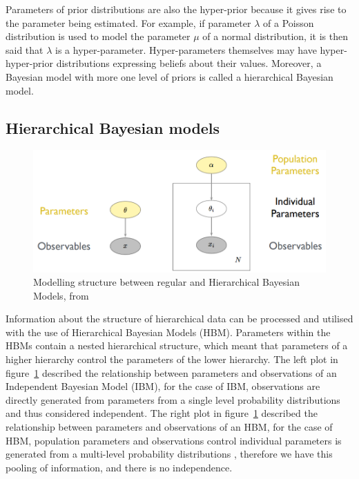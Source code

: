 \newpara

Parameters of prior distributions are also the hyper-prior because it gives rise to the parameter being estimated. For example, if parameter $\lambda$ of a Poisson distribution is used to model the parameter $\mu$ of a normal distribution, it is then said that $\lambda$ is a hyper-parameter. Hyper-parameters themselves may have hyper-hyper-prior distributions expressing beliefs about their values. Moreover, a Bayesian model with more one level of priors is called a hierarchical Bayesian model.

\subsection{Hierarchical Bayesian models}

\begin{figure}[hb]
	\centering
	\includegraphics[width=0.7\linewidth]{Figures/hbm}
	\caption{Modelling structure between regular and Hierarchical Bayesian Models, from \citet{Wolfgang2016}}
	\label{fig:hbm}
\end{figure}

Information about the structure of hierarchical data can be processed and utilised with the use of Hierarchical Bayesian Models (HBM). Parameters within the HBMs contain a nested hierarchical structure, which meant that parameters of a higher hierarchy control the parameters of the lower hierarchy. The left plot in figure~\ref{fig:hbm} described the relationship between parameters and observations of an Independent Bayesian Model (IBM), for the case of IBM, observations are directly generated from parameters from a single level probability distributions and thus considered independent. The right plot in figure~\ref{fig:hbm} described the relationship between parameters and observations of an HBM, for the case of HBM, population parameters and observations control individual parameters is generated from a multi-level probability distributions \citep{gelman2007data, Wolfgang2016}, therefore we have this pooling of information, and there is no independence.

\newpara

